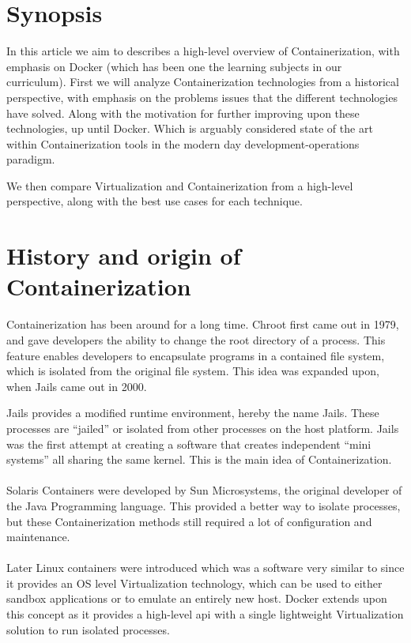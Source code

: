 \documentclass[a4paper,10pt]{article}
\begin{document}
	\section{Synopsis}
	In this article we aim to describes a high-level overview of Containerization, with emphasis on Docker (which has been one the learning subjects in our curriculum). First we will analyze Containerization technologies from a historical perspective, with emphasis on the problems issues that the different technologies have solved. Along with the motivation for further improving upon these technologies, up until Docker. Which is arguably considered state of the art within Containerization tools in the modern day development-operations paradigm. 
	
	We then compare Virtualization and Containerization from a high-level perspective, along with the best use cases for each technique. 
	
	\section{History and origin of Containerization}
	Containerization has been around for a long time. Chroot first came out in 1979, and gave developers the ability to change the root directory of a process. This feature enables developers to encapsulate programs in a contained file system, which is isolated from the original file system. This idea was expanded upon, when Jails came out in 2000.

	Jails provides a modified runtime environment, hereby the name Jails. \cite{pii:2014}These processes are “jailed” or isolated from other processes on the host platform. Jails was the first attempt at creating a software that creates independent “mini systems” all sharing the same kernel. This is the main idea of Containerization. \\\\
	Solaris Containers were developed by Sun Microsystems, the original developer of the Java Programming language. This provided a better way to isolate processes, but these Containerization methods still required a lot of configuration and maintenance.\\\\
	Later Linux containers were introduced which was a software very similar to since it provides an OS level Virtualization technology, which can be used to either sandbox applications or to emulate an entirely new host. Docker extends upon this concept as it provides a high-level api with a single lightweight Virtualization solution to run isolated processes. 
	
\end{document}
